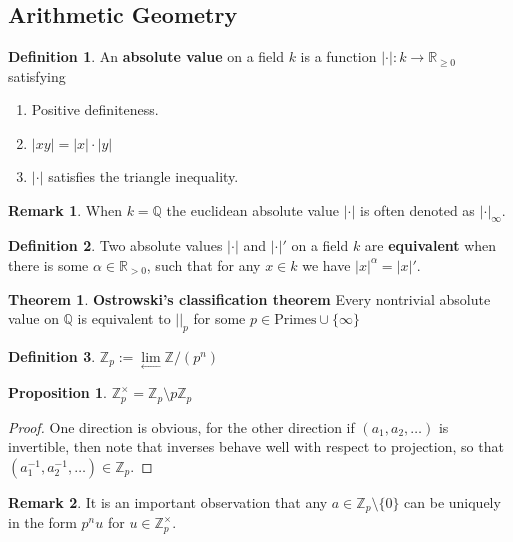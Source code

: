 \documentclass[11pt]{article}
\theoremstyle{definition}
\newtheorem{defn}{Definition}
\newtheorem{thm}{Theorem}
\newtheorem{prop}{Proposition}
\newtheorem*{rmk}{Remark}
\newcommand{\set}[1]{\{#1\}}
\newcommand{\abs}[1]{\lvert#1\rvert}
\begin{document}
    \subsection{Arithmetic Geometry}
    \begin{defn}
        An \textbf{absolute value} on a field \(k\) is a function \(\abs{\cdot}: k \to \mathbb{R}_{\geq 0}\) satisfying
        \begin{enumerate}
            \item Positive definiteness.
            \item \(\abs{xy} = \abs{x}\cdot\abs{y}\)
            \item \(\abs{\cdot}\) satisfies the triangle inequality.
        \end{enumerate}
    \end{defn}
    \begin{rmk}
        When \(k = \mathbb{Q}\) the euclidean absolute value \(\abs{\cdot}\) is often denoted as \(\abs{\cdot}_\infty\).
    \end{rmk}
    \begin{defn}
        Two absolute values \(\abs{\cdot}\) and \(\abs{\cdot}'\) on a field \(k\) are \textbf{equivalent} when there is some \(\alpha \in \mathbb{R}_{>0}\), such that for any \(x \in k\) we have \(\abs{x}^\alpha = \abs{x}'\).
    \end{defn}
    \begin{thm}
        \textbf{Ostrowski's classification theorem} Every nontrivial absolute value on \(\mathbb{Q}\) is equivalent to \(\abs{}_p\) for some \(p \in \text{Primes}\cup\set{\infty}\)
    \end{thm}
    \begin{defn}
        \(\mathbb{Z}_p := \lim\limits_{\longleftarrow} \mathbb{Z}/(p^n)\)
    \end{defn}
    \begin{prop}
        \(\mathbb{Z}_p^\times = \mathbb{Z}_p \setminus p \mathbb{Z}_p\)
        \begin{proof}
            One direction is obvious, for the other direction if \((a_1,a_2,\hdots)\) is invertible, then note that inverses behave well with respect to projection, so that \((a_1^{-1},a_2^{-1},\hdots) \in \mathbb{Z}_p\).
        \end{proof}
    \end{prop}
    \begin{rmk}
        It is an important observation that any \(a \in \mathbb{Z}_p \setminus \set{0}\) can be uniquely in the form \(p^nu\) for \(u \in \mathbb{Z}_p^\times\). 
    \end{rmk}
\end{document}

